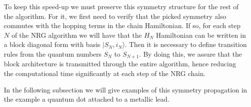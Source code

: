 To keep this speed-up we must preserve this symmetry structure for the rest of the algorithm. For it, we first need to verify that the picked symmetry also commutes with the hopping terms in the chain Hamiltonian. If so, for each step  $N$ of the NRG algorithm we will have that the $H_N$ Hamiltonian can be written in a block diagonal form with basis 
$\vert S_N, i_N\rangle$. Then it is necessary to define transition rules from the quantum numbers $S_N$ to $S_{N+1}$. By doing this, we assure that the block architecture is transmitted through the entire algorithm, hence reducing the computational time significantly at each step of the NRG chain. 


In the following subsection we will give examples of this symmetry propagation in the example a quantum dot attached to a metallic lead. 








 



